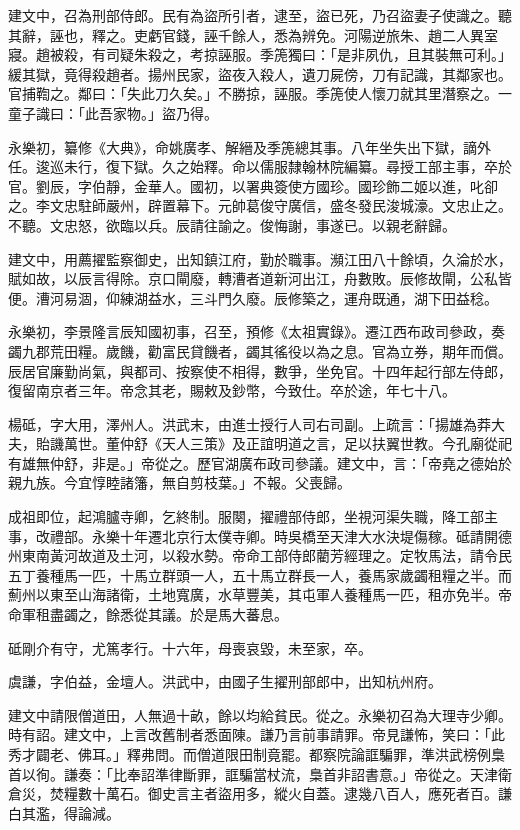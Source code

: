 \begin{pinyinscope}
建文中，召為刑部侍郎。民有為盜所引者，逮至，盜已死，乃召盜妻子使識之。聽其辭，誣也，釋之。吏虧官錢，誣千餘人，悉為辨免。河陽逆旅朱、趙二人異室寢。趙被殺，有司疑朱殺之，考掠誣服。季箎獨曰：「是非夙仇，且其裝無可利。」緩其獄，竟得殺趙者。揚州民家，盜夜入殺人，遺刀屍傍，刀有記識，其鄰家也。官捕鞫之。鄰曰：「失此刀久矣。」不勝掠，誣服。季箎使人懷刀就其里潛察之。一童子識曰：「此吾家物。」盜乃得。

永樂初，纂修《大典》，命姚廣孝、解縉及季箎總其事。八年坐失出下獄，謫外任。逡巡未行，復下獄。久之始釋。命以儒服隸翰林院編纂。尋授工部主事，卒於官。劉辰，字伯靜，金華人。國初，以署典簽使方國珍。國珍飾二姬以進，叱卻之。李文忠駐師嚴州，辟置幕下。元帥葛俊守廣信，盛冬發民浚城濠。文忠止之。不聽。文忠怒，欲臨以兵。辰請往諭之。俊悔謝，事遂已。以親老辭歸。

建文中，用薦擢監察御史，出知鎮江府，勤於職事。瀕江田八十餘頃，久淪於水，賦如故，以辰言得除。京口閘廢，轉漕者道新河出江，舟數敗。辰修故閘，公私皆便。漕河易涸，仰練湖益水，三斗門久廢。辰修築之，運舟既通，湖下田益稔。

永樂初，李景隆言辰知國初事，召至，預修《太祖實錄》。遷江西布政司參政，奏蠲九郡荒田糧。歲饑，勸富民貸饑者，蠲其徭役以為之息。官為立券，期年而償。辰居官廉勤尚氣，與都司、按察使不相得，數爭，坐免官。十四年起行部左侍郎，復留南京者三年。帝念其老，賜敕及鈔幣，今致仕。卒於途，年七十八。

楊砥，字大用，澤州人。洪武末，由進士授行人司右司副。上疏言：「揚雄為莽大夫，貽譏萬世。董仲舒《天人三策》及正誼明道之言，足以扶翼世教。今孔廟從祀有雄無仲舒，非是。」帝從之。歷官湖廣布政司參議。建文中，言：「帝堯之德始於親九族。今宜惇睦諸籓，無自剪枝葉。」不報。父喪歸。

成祖即位，起鴻臚寺卿，乞終制。服闋，擢禮部侍郎，坐視河渠失職，降工部主事，改禮部。永樂十年遷北京行太僕寺卿。時吳橋至天津大水決堤傷稼。砥請開德州東南黃河故道及土河，以殺水勢。帝命工部侍郎藺芳經理之。定牧馬法，請令民五丁養種馬一匹，十馬立群頭一人，五十馬立群長一人，養馬家歲蠲租糧之半。而薊州以東至山海諸衛，土地寬廣，水草豐美，其屯軍人養種馬一匹，租亦免半。帝命軍租盡蠲之，餘悉從其議。於是馬大蕃息。

砥剛介有守，尤篤孝行。十六年，母喪哀毀，未至家，卒。

虞謙，字伯益，金壇人。洪武中，由國子生擢刑部郎中，出知杭州府。

建文中請限僧道田，人無過十畝，餘以均給貧民。從之。永樂初召為大理寺少卿。時有詔。建文中，上言改舊制者悉面陳。謙乃言前事請罪。帝見謙怖，笑曰：「此秀才闢老、佛耳。」釋弗問。而僧道限田制竟罷。都察院論誆騙罪，準洪武榜例梟首以徇。謙奏：「比奉詔準律斷罪，誆騙當杖流，梟首非詔書意。」帝從之。天津衛倉災，焚糧數十萬石。御史言主者盜用多，縱火自蓋。逮幾八百人，應死者百。謙白其濫，得論減。


\end{pinyinscope}
